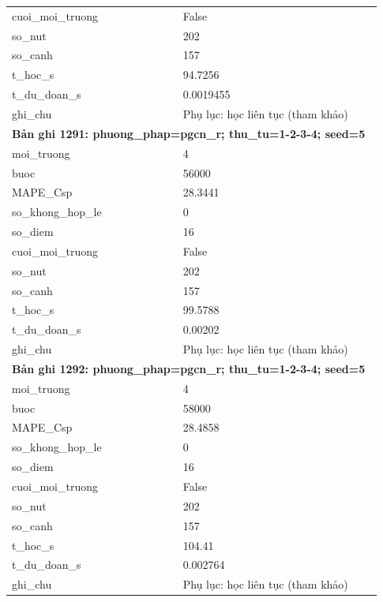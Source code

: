 \begin{longtable}{p{0.43\linewidth}p{0.50\linewidth}}
cuoi\_\allowbreak moi\_\allowbreak truong & False \\
so\_\allowbreak nut & 202 \\
so\_\allowbreak canh & 157 \\
t\_\allowbreak hoc\_\allowbreak s & 94.7256 \\
t\_\allowbreak du\_\allowbreak doan\_\allowbreak s & 0.0019455 \\
ghi\_\allowbreak chu & Phụ lục: học liên tục (tham khảo) \\
\midrule
\multicolumn{2}{p{0.95\linewidth}}{\textbf{Bản ghi 1291: phuong\_phap=pgcn\_r; thu\_tu=1-2-3-4; seed=5}} \\
moi\_\allowbreak truong & 4 \\
buoc & 56000 \\
MAPE\_\allowbreak Csp & 28.3441 \\
so\_\allowbreak khong\_\allowbreak hop\_\allowbreak le & 0 \\
so\_\allowbreak diem & 16 \\
cuoi\_\allowbreak moi\_\allowbreak truong & False \\
so\_\allowbreak nut & 202 \\
so\_\allowbreak canh & 157 \\
t\_\allowbreak hoc\_\allowbreak s & 99.5788 \\
t\_\allowbreak du\_\allowbreak doan\_\allowbreak s & 0.00202 \\
ghi\_\allowbreak chu & Phụ lục: học liên tục (tham khảo) \\
\midrule
\multicolumn{2}{p{0.95\linewidth}}{\textbf{Bản ghi 1292: phuong\_phap=pgcn\_r; thu\_tu=1-2-3-4; seed=5}} \\
moi\_\allowbreak truong & 4 \\
buoc & 58000 \\
MAPE\_\allowbreak Csp & 28.4858 \\
so\_\allowbreak khong\_\allowbreak hop\_\allowbreak le & 0 \\
so\_\allowbreak diem & 16 \\
cuoi\_\allowbreak moi\_\allowbreak truong & False \\
so\_\allowbreak nut & 202 \\
so\_\allowbreak canh & 157 \\
t\_\allowbreak hoc\_\allowbreak s & 104.41 \\
t\_\allowbreak du\_\allowbreak doan\_\allowbreak s & 0.002764 \\
ghi\_\allowbreak chu & Phụ lục: học liên tục (tham khảo) \\

\end{longtable}
